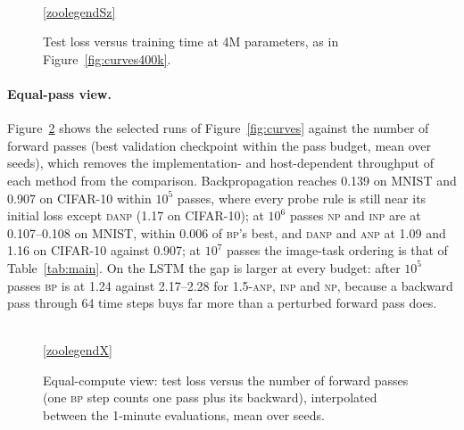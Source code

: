 \documentclass{article}
\newcommand{\method}[1]{\textsc{#1}}
\newcommand{\BP}{\method{bp}}
\newcommand{\NP}{\method{np}}
\newcommand{\ANP}{\method{anp}}
\newcommand{\ANPb}{\method{1.5-anp}}
\newcommand{\INP}{\method{inp}}
\newcommand{\DANP}{\method{danp}}
\begin{document}
\begin{figure}[ht]
  \centering
  
  \\[0.5ex]
  \ref{zoolegendSz}
  \caption{Test loss versus training time at 4M parameters, as in Figure~\ref{fig:curves400k}.}
  \label{fig:curves4m}
\end{figure}

\paragraph{Equal-pass view.}
Figure~\ref{fig:passes} shows the selected runs of Figure~\ref{fig:curves} against the
number of forward passes (best validation checkpoint within the pass budget, mean over
seeds), which removes the implementation- and host-dependent throughput of each method
from the comparison. Backpropagation reaches 0.139 on MNIST and 0.907 on CIFAR-10
within $10^{5}$ passes, where every probe rule is still near its initial loss except
\DANP{} (1.17 on CIFAR-10); at $10^{6}$ passes \NP{} and \INP{} are at 0.107--0.108 on
MNIST, within 0.006 of \BP{}'s best, and \DANP{} and \ANP{} at 1.09 and 1.16 on
CIFAR-10 against 0.907; at $10^{7}$ passes the image-task ordering is that of
Table~\ref{tab:main}. On the LSTM the gap is larger at every budget: after $10^{5}$
passes \BP{} is at 1.24 against 2.17--2.28 for \ANPb{}, \INP{} and \NP{}, because a
backward pass through 64 time steps buys far more than a perturbed forward pass does.

\begin{figure}[t]
  \centering
  
  \\[0.5ex]
  \ref{zoolegendX}
  \caption{Equal-compute view: test loss versus the number of forward passes (one
  \BP{} step counts one pass plus its backward), interpolated between the 1-minute
  evaluations, mean over seeds.}
  \label{fig:passes}
\end{figure}
\end{document}
